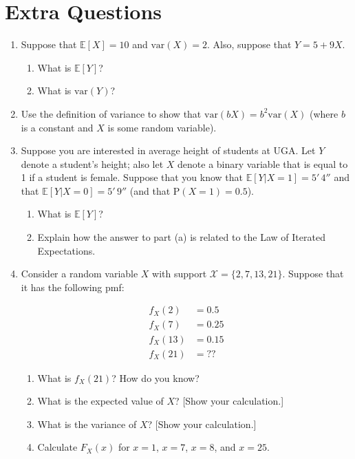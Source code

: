 \documentclass[
  letterpaper,
  DIV=11,
  numbers=noendperiod]{scrreprt}
\begin{document}
\section{Extra Questions}\label{extra-questions}

\begin{enumerate}
\def\labelenumi{\arabic{enumi}.}
\item
  Suppose that \(\mathbb{E}[X] = 10\) and \(\mathrm{var}(X) = 2\). Also,
  suppose that \(Y=5 + 9 X\).

  \begin{enumerate}
  \def\labelenumii{\alph{enumii})}
  \item
    What is \(\mathbb{E}[Y]\)?
  \item
    What is \(\mathrm{var}(Y)\)?
  \end{enumerate}
\item
  Use the definition of variance to show that
  \(\mathrm{var}(bX) = b^2 \mathrm{var}(X)\) (where \(b\) is a constant
  and \(X\) is some random variable).
\item
  Suppose you are interested in average height of students at UGA. Let
  \(Y\) denote a student's height; also let \(X\) denote a binary
  variable that is equal to 1 if a student is female. Suppose that you
  know that \(\mathbb{E}[Y|X=1] = 5' \,4''\) and that
  \(\mathbb{E}[Y|X=0] = 5' \,9''\) (and that \(\mathrm{P}(X=1) = 0.5\)).

  \begin{enumerate}
  \def\labelenumii{\alph{enumii})}
  \item
    What is \(\mathbb{E}[Y]\)?
  \item
    Explain how the answer to part (a) is related to the Law of Iterated
    Expectations.
  \end{enumerate}
\item
  Consider a random variable \(X\) with support
  \(\mathcal{X} = \{2,7,13,21\}\). Suppose that it has the following
  pmf:

  \[
      \begin{aligned}
       f_X(2) &= 0.5 \\
       f_X(7) &= 0.25 \\
       f_X(13) &= 0.15 \\
       f_X(21) &= ??
     \end{aligned}
   \]

  \begin{enumerate}
  \def\labelenumii{\alph{enumii})}
  \item
    What is \(f_X(21)\)? How do you know?
  \item
    What is the expected value of \(X\)? {[}Show your calculation.{]}
  \item
    What is the variance of \(X\)? {[}Show your calculation.{]}
  \item
    Calculate \(F_X(x)\) for \(x=1\), \(x=7\), \(x=8\), and \(x=25\).
  \end{enumerate}
\end{enumerate}
\end{document}
